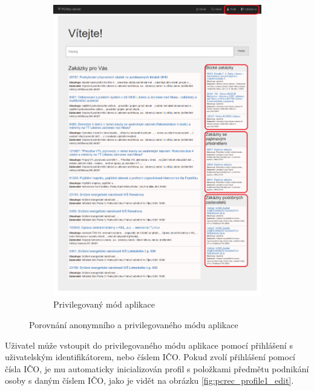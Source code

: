 \documentclass[thesis=M,czech]{FITthesis}[2019/12/23]
\begin{document}
\begin{figure}[!h]
\begin{subfigure}{.5\textwidth}
	\includegraphics[width=\textwidth]{images/pcrec/pcrec_main_edit.png}
	\caption{Privilegovaný mód aplikace}\label{fig:pcrec_main_edit}
\end{subfigure}
\caption{Porovnání anonymního a privilegovaného módu aplikace}
\label{fig:pcrec_anonymous_vs_priviledged}
\end{figure}
\newpage

Uživatel může vstoupit do privilegovaného módu aplikace pomocí přihlášení s uživatelským identifikátorem, nebo číslem IČO.
Pokud zvolí přihlášení pomocí čísla IČO, je mu automaticky inicializován profil s položkami předmětu podnikání osoby s daným číslem IČO, jako je vidět na obrázku
\ref{fig:pcrec_profile1_edit}.
\end{document}
